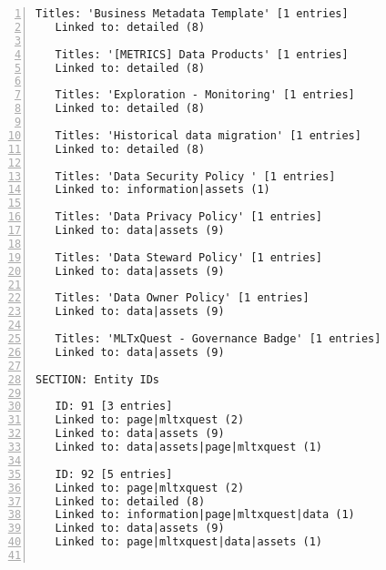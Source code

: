 \documentclass[10pt]{article}
\begin{document}
{\begin{lstlisting}[numbers=left,basicstyle=\ttfamily\footnotesize, frame=none]
   Titles: 'Business Metadata Template' [1 entries]
   Linked to: detailed (8)

   Titles: '[METRICS] Data Products' [1 entries]
   Linked to: detailed (8)

   Titles: 'Exploration - Monitoring' [1 entries]
   Linked to: detailed (8)

   Titles: 'Historical data migration' [1 entries]
   Linked to: detailed (8)

   Titles: 'Data Security Policy ' [1 entries]
   Linked to: information|assets (1)

   Titles: 'Data Privacy Policy' [1 entries]
   Linked to: data|assets (9)

   Titles: 'Data Steward Policy' [1 entries]
   Linked to: data|assets (9)

   Titles: 'Data Owner Policy' [1 entries]
   Linked to: data|assets (9)

   Titles: 'MLTxQuest - Governance Badge' [1 entries]
   Linked to: data|assets (9)

SECTION: Entity IDs

   ID: 91 [3 entries]                                              ID: 511 [1 entries]
   Linked to: page|mltxquest (2)                                   Linked to: detailed (8)
   Linked to: data|assets (9)                                      Agents: ('Data',)
   Linked to: data|assets|page|mltxquest (1)                       
                                                                   ID: 513 [1 entries]
   ID: 92 [5 entries]                                              Linked to: detailed (8)
   Linked to: page|mltxquest (2)                                   Agents: ('Data',)
   Linked to: detailed (8)                                         
   Linked to: information|page|mltxquest|data (1)                  ID: 223 [1 entries]
   Linked to: data|assets (9)                                      Linked to: information|assets (1)
   Linked to: page|mltxquest|data|assets (1)                       Agents: ('Policy', 'Governance')
                                                                   

\end{lstlisting}}
\end{document}
